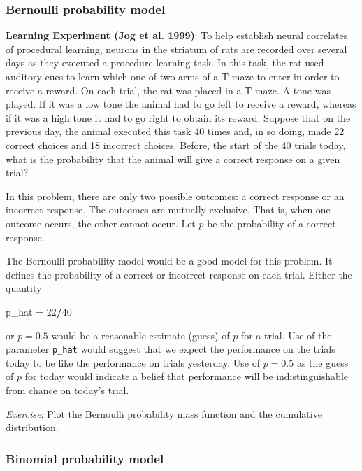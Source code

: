 \documentclass[
]{article}
\newenvironment{Shaded}{\begin{snugshade}}{\end{snugshade}}
\newcommand{\DecValTok}[1]{\textcolor[rgb]{0.00,0.00,0.81}{#1}}
\newcommand{\NormalTok}[1]{#1}
\newcommand{\OtherTok}[1]{\textcolor[rgb]{0.56,0.35,0.01}{#1}}
\newcommand{\SpecialCharTok}[1]{\textcolor[rgb]{0.81,0.36,0.00}{\textbf{#1}}}
\begin{document}
\hypertarget{bernoulli-probability-model}{%
\subsubsection{Bernoulli probability
model}\label{bernoulli-probability-model}}

\textbf{Learning Experiment (Jog et al. 1999)}: To help establish neural
correlates of procedural learning, neurons in the striatum of rats are
recorded over several days as they executed a procedure learning task.
In this task, the rat used auditory cues to learn which one of two arms
of a T-maze to enter in order to receive a reward. On each trial, the
rat was placed in a T-maze. A tone was played. If it was a low tone the
animal had to go left to receive a reward, whereas if it was a high tone
it had to go right to obtain its reward. Suppose that on the previous
day, the animal executed this task 40 times and, in so doing, made 22
correct choices and 18 incorrect choices. Before, the start of the 40
trials today, what is the probability that the animal will give a
correct response on a given trial?

In this problem, there are only two possible outcomes: a correct
response or an incorrect response. The outcomes are mutually exclusive.
That is, when one outcome occurs, the other cannot occur. Let \(p\) be
the probability of a correct response.

The Bernoulli probability model would be a good model for this problem.
It defines the probability of a correct or incorrect response on each
trial. Either the quantity

\begin{Shaded}
\begin{Highlighting}[]
\NormalTok{p\_hat }\OtherTok{=} \DecValTok{22}\SpecialCharTok{/}\DecValTok{40}
\end{Highlighting}
\end{Shaded}

or \(p = 0.5\) would be a reasonable estimate (guess) of \(p\) for a
trial. Use of the parameter \texttt{p\_hat} would suggest that we expect
the performance on the trials today to be like the performance on trials
yesterday. Use of \(p = 0.5\) as the guess of \(p\) for today would
indicate a belief that performance will be indistinguishable from chance
on today's trial.

\emph{Exercise}: Plot the Bernoulli probability mass function and the
cumulative distribution.

\hypertarget{binomial-probability-model}{%
\subsubsection{Binomial probability
model}\label{binomial-probability-model}}
\end{document}
